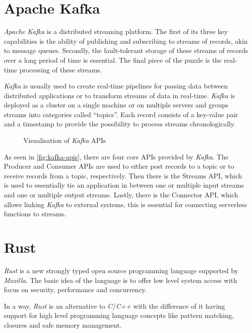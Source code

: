 \section{Apache Kafka}
\label{sec:background-kafka}

\textit{Apache Kafka} is a distributed streaming platform. The first of its three key capabilities
is the ability of publishing and subscribing to streams of records, akin to message queues.
Secondly, the fault-tolerant storage of these streams of records over a long period of time is
essential. The final piece of the puzzle is the real-time processing of these streams.

\textit{Kafka} is usually used to create real-time pipelines for passing data between distributed
applications or to transform streams of data in real-time. \textit{Kafka} is deployed as a cluster
on a single machine or on multiple servers and groups streams into categories called “topics”. Each
record consists of a key-value pair and a timestamp to provide the possibility to process streams
chronologically.

\begin{figure}[H]
  \centering
  \caption{Visualisation of \textit{Kafka} APIs \cite{kafka-complete-introduction}}
  \label{fig:kafka-apis}
\end{figure}

As seen in \autoref{fig:kafka-apis}, there are four core APIs provided by \textit{Kafka}. The
Producer and Consumer APIs are used to either post records to a topic or to receive records from a
topic, respectively. Then there is the Streams API, which is used to essentially tie an application
in between one or multiple input streams and one or multiple output streams. Lastly, there is the
Connector API, which allows linking \textit{Kafka} to external systems, this is essential for
connecting serverless functions to streams.
\cite{kafka-introduction}

\section{Rust}

\textit{Rust} is a new strongly typed open source programming language supported by
\textit{Mozilla}. The basic idea of the language is to offer low level system access with focus on
security, performance and concurrency. \cite{rustbook1, forkjoin}

In a way, \textit{Rust} is an alternative to \textit{C}/\textit{C++} with the difference of it
having support for high level programming language concepts like pattern matching, closures and safe
memory management. \cite{rustbook1, forkjoin}

